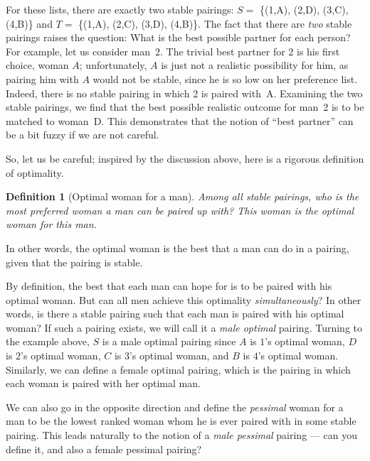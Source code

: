 \documentclass[11pt,fleqn]{article}
\newcounter{thm}
\newtheorem{definition}{Definition}[thm]
\begin{document}
\noindent For these lists, there are exactly two stable
pairings: $S = $ \{(1,A), (2,D), (3,C), (4,B)\} and $T
= $ \{(1,A), (2,C), (3,D), (4,B)\}. The fact that there are \emph{two} stable pairings raises the question: What is the
best possible partner for each person? For example, let us consider man~$2$. The trivial best partner for $2$ is his first choice, woman $A$; unfortunately, $A$ is just not a realistic possibility for him, as pairing him with $A$ would not be stable, since he
is so low on her preference list. Indeed, there is no
stable pairing in which 2 is paired with~A. Examining the two stable pairings,
we find that the best possible realistic outcome for man~2
is to be matched to woman~D. This demonstrates that the notion of ``best partner'' can be a bit fuzzy if we are not careful.

So, let us be careful; inspired by the discussion above, here is a rigorous definition of optimality.

\begin{definition}[Optimal woman for a man]
Among all stable pairings, who is the most preferred woman a man can be paired up with? This woman is the \emph{optimal} woman for this man.
\end{definition}
In other words, the optimal woman is the best that a man can do in a pairing, given that the pairing is {stable}.


By definition, the best that each man can hope for is to be paired with his
optimal woman. But can all men achieve this optimality {\it simultaneously\/}?
In other words, is there a stable pairing such that
each man is paired with his optimal woman? If such a pairing exists, we
will call it a {\it male optimal\/} pairing. Turning to the example above, $S$ is
a male optimal pairing since $A$ is $1$'s optimal woman, $D$ is $2$'s optimal
woman, $C$ is $3$'s optimal woman, and $B$ is $4$'s optimal woman. Similarly, we
can define a female optimal pairing, which is the pairing in which each
woman is paired with her optimal man.


We can also
go in the opposite direction and define the {\it pessimal\/} woman for
a man to be the lowest ranked woman whom he is ever paired with
in some stable pairing. This leads naturally to the notion of a {\it male
pessimal\/} pairing --- can you define it, and also a female pessimal
pairing?
\end{document}
